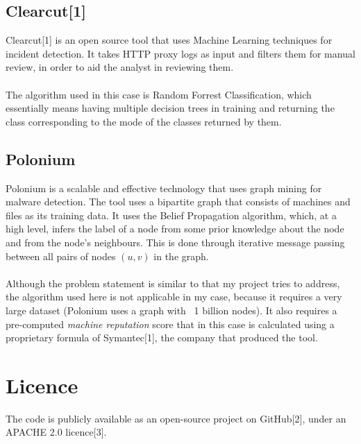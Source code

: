 \documentclass[12pt,a4paper,twoside,openright]{report}
\begin{document}
\subsection{Clearcut[1]}
Clearcut[1] is an open source tool that uses Machine Learning techniques for incident detection. It takes HTTP proxy logs as input and filters them for manual review, in order to aid the analyst in reviewing them. 
\\ \\ 
The algorithm used in this case is Random Forrest Classification, which essentially means having multiple decision trees in training and returning the class corresponding to the mode of the classes returned by them. 


\subsection{Polonium}
Polonium is a scalable and effective technology that uses graph mining for malware detection. The tool uses a bipartite graph that consists of machines and files as its training data. It uses the Belief Propagation algorithm, which, at a high level, infers the label of a node from some prior knowledge about the node and from the node's neighbours. This is done through iterative message passing between all pairs of nodes $(u, v)$ in the graph. 
\\ \\
Although the problem statement is similar to that my project tries to address, the algorithm used here is not applicable in my case, because it requires a very large dataset (Polonium uses a graph with ~1 billion nodes). It also requires a pre-computed \textit{machine reputation} score that in this case is calculated using a proprietary formula of Symantec[1], the company that produced the tool. 


\section{Licence} 
The code is publicly available as an open-source project on GitHub[2], under an APACHE 2.0 licence[3]. 


\end{document}
